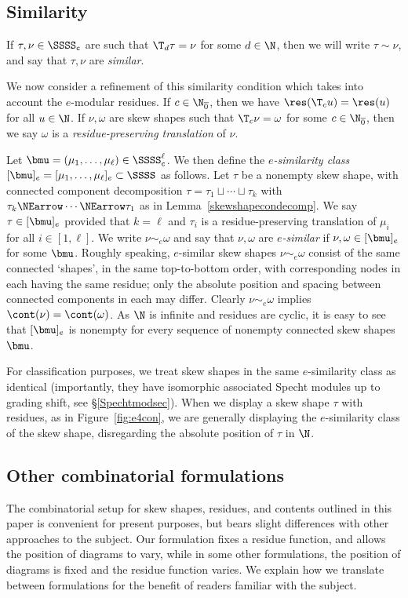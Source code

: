 \subsection{Similarity}\label{similaritysec}
If \(\tau, \nu \in \SSSS_{\tt c}\) are such that \(\T_d \tau = \nu\) for some \(d \in \N\), then we will write \(\tau \sim \nu\), and say that \(\tau, \nu\) are {\em similar}.

We now consider a refinement of this similarity condition which takes into account the \(e\)-modular residues.
If \(c \in \N_{\overline 0}\), then we have \(\res(\T_c u) = \res(u)\) for all \(u \in \N\). If \(\nu, \omega\) are skew shapes such that \(\T_c \nu= \omega\) for some \(c \in \N_{\overline{0}}\), then we say \(\omega\) is a {\em residue-preserving translation} of \(\nu\).

Let \(\bmu = (\mu_1, \ldots, \mu_\ell) \in \SSSS_{\tt c}^\ell\). We then define the {\em \(e\)-similarity class} \([\bmu]_e = [\mu_1, \ldots, \mu_\ell]_e \subset \SSSS\) as follows. Let \(\tau\) be a nonempty skew shape, with connected component decomposition \(\tau = \tau_1 \sqcup \cdots \sqcup \tau_k\) with \(\tau_k \NEarrow \cdots \NEarrow \tau_1\) as in Lemma~\ref{skewshapecondecomp}. We say \(\tau \in [\bmu]_e\) provided that \(k = \ell\) and \(\tau_i\) is a residue-preserving translation of \(\mu_i\) for all \(i \in [1,\ell]\). We write \(\nu \sim_e \omega\) and say that \(\nu, \omega\) are {\em \(e\)-similar} if \(\nu,\omega \in [\bmu]_e\) for some \(\bmu\). Roughly speaking, 
\(e\)-similar skew shapes \(\nu\sim_e\omega\) consist of the same connected `shapes', in the same top-to-bottom order, with corresponding nodes in each having the same residue; only the absolute position and spacing between connected components in each may differ. Clearly \(\nu \sim_e \omega\) implies \(\cont(\nu) = \cont(\omega)\). As \(\N\) is infinite and residues are cyclic, it is easy to see that \([\bmu]_e\) is nonempty for every sequence of nonempty connected skew shapes \(\bmu\).

For classification purposes, we treat skew shapes in the same \(e\)-similarity class as identical (importantly, they have isomorphic associated Specht modules up to grading shift, see \S\ref{Spechtmodsec}).
When we display a skew shape \(\tau\) with residues, as in Figure~\ref{fig:e4con}, we are generally displaying the \(e\)-similarity class of the skew shape, disregarding the absolute position of \(\tau\) in \(\N\).

\subsection{Other combinatorial formulations}\label{otherformsec}
The combinatorial setup for skew shapes, residues, and contents outlined in this paper is convenient for present purposes, but bears slight differences with other approaches to the subject. Our formulation fixes a residue function, and allows the position of diagrams to vary, while in some other formulations, the position of diagrams is fixed and the residue function varies. We explain how we translate between formulations for the benefit of readers familiar with the subject.

